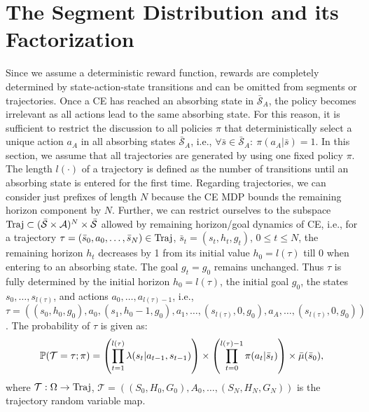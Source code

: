 \section{The Segment Distribution and its Factorization}
\label{ap:SegmentDist}
Since we assume a deterministic reward function, rewards are completely determined by state-action-state transitions and can be omitted from segments or trajectories. Once a CE has reached an absorbing state in $\bar{\mathcal{S}}_A$, the policy becomes irrelevant as all actions lead to the same absorbing state. For this reason, it is sufficient to restrict the discussion to all policies $\pi$ that deterministically select a unique action $a_A$ in all absorbing states $\bar{\mathcal{S}}_A$, i.e.,
$\forall \bar{s} \in \bar{\mathcal{S}}_A:\:\pi(a_A|\bar{s}) = 1$. In this section, we assume that all trajectories are generated by using one fixed policy $\pi$.
The length $l(\cdot)$ of a trajectory is defined as the number of transitions
until an absorbing state is entered for the first time.
Regarding trajectories, we can consider just prefixes of length $N$ because the
CE MDP bounds the remaining horizon component by $N$. Further, we can
restrict ourselves to the subspace $\mathrm{Traj} \subset (\bar{\mathcal{S}}\times\mathcal{A})^N\times\bar{\mathcal{S}}$ allowed
by remaining horizon/goal dynamics of CE, i.e., for a trajectory
$\tau = (\bar{s}_0,a_0,\ldots,\bar{s}_N) \in \mathrm{Traj}$, $\bar{s}_t = (s_t,h_t,g_t)$, $0\leq t\leq N$,
the remaining horizon $h_t$ decreases by 1
from its initial value $h_0=l(\tau)$ till 0 when entering to
an absorbing state. The goal $g_t=g_0$ remains unchanged.
Thus $\tau$ is fully determined by the initial horizon $h_0=l(\tau)$, the initial goal $g_0$, the
states $s_0,\ldots,s_{l(\tau)}$, and actions $a_0,\ldots,a_{l(\tau)-1}$, i.e.,
$\tau = ((s_0,h_0,g_0),a_0,(s_1,h_0-1,g_0),a_1,\ldots,(s_{l(\tau)},0,g_0),a_A,\ldots,(s_{l(\tau)},0,g_0))$.
The probability of $\tau$ is given as:
$$
\mathbb{P}( \mathcal{T} = \tau;\pi)
=
\left( \prod_{t=1}^{l(\tau)}
\mathit{\lambda}(s_t | a_{t-1}, s_{t-1})
\right)
\times
\left( \prod_{t=0}^{l(\tau)-1}
\pi(a_t|\bar{s}_t)
\right)
\times
\bar{\mu}(\bar{s}_0),
$$
where $\mathcal{T}:\Omega\rightarrow\mathrm{Traj}$, $\mathcal{T} = ((S_0,H_0,G_0),A_0,\ldots,(S_N,H_N,G_N))$ is the trajectory random variable map.

